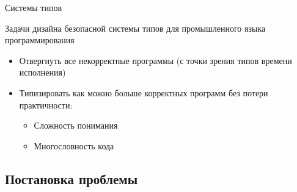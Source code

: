 \documentclass[usenames, dvipsnames]{beamer}
\begin{document}
\begin{frame}{Системы типов}
        \begin{block}{Задачи дизайна безопасной системы типов для промышленного языка программирования}
            \begin{itemize}
                \item Отвергнуть все некорректные программы (с точки зрения типов времени исполнения)
                \item Типизировать как можно больше корректных программ без потери практичности:
                \begin{itemize}
                    \item Сложность понимания
                    \item Многословность кода
                \end{itemize}
            \end{itemize}
        \end{block}
    \end{frame}


    \subsection{Постановка проблемы}
\end{document}
